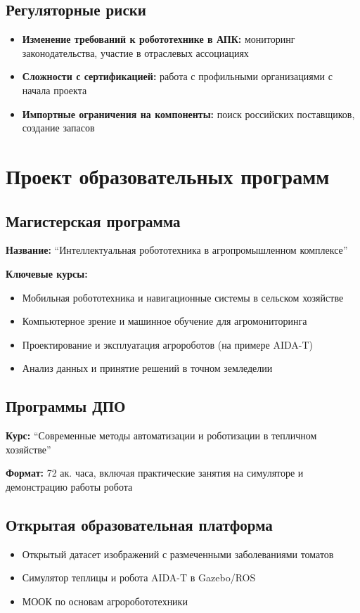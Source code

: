 \documentclass[12pt,a4paper]{article}
\begin{document}
\subsection{Регуляторные риски}
\begin{itemize}
    \item \textbf{Изменение требований к робототехнике в АПК:} мониторинг законодательства, участие в отраслевых ассоциациях
    \item \textbf{Сложности с сертификацией:} работа с профильными организациями с начала проекта
    \item \textbf{Импортные ограничения на компоненты:} поиск российских поставщиков, создание запасов
\end{itemize}

\section{Проект образовательных программ}

\subsection{Магистерская программа}
\textbf{Название:} ``Интеллектуальная робототехника в агропромышленном комплексе''

\textbf{Ключевые курсы:}
\begin{itemize}
    \item Мобильная робототехника и навигационные системы в сельском хозяйстве
    \item Компьютерное зрение и машинное обучение для агромониторинга
    \item Проектирование и эксплуатация агророботов (на примере AIDA-T)
    \item Анализ данных и принятие решений в точном земледелии
\end{itemize}

\subsection{Программы ДПО}
\textbf{Курс:} ``Современные методы автоматизации и роботизации в тепличном хозяйстве''

\textbf{Формат:} 72 ак. часа, включая практические занятия на симуляторе и демонстрацию работы робота

\subsection{Открытая образовательная платформа}
\begin{itemize}
    \item Открытый датасет изображений с размеченными заболеваниями томатов
    \item Симулятор теплицы и робота AIDA-T в Gazebo/ROS
    \item МООК по основам агроробототехники
\end{itemize}
\end{document}
